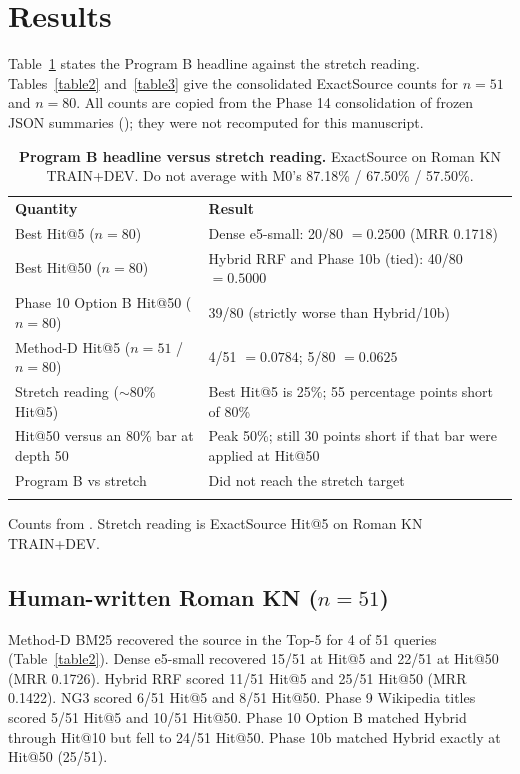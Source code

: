\documentclass[10pt,letterpaper]{article}
\newlength\savedwidth
\newcommand\thickhline{\noalign{\global\savedwidth\arrayrulewidth\global\arrayrulewidth 2pt}%
\hline
\noalign{\global\arrayrulewidth\savedwidth}}
\begin{document}
\section*{Results}
Table~\ref{table1} states the Program B headline against the stretch reading. Tables~\ref{table2} and~\ref{table3} give the consolidated ExactSource counts for $n = 51$ and $n = 80$. All counts are copied from the Phase 14 consolidation of frozen JSON summaries (); they were not recomputed for this manuscript.

\begin{table}[!ht]
\centering
\caption{\textbf{Program B headline versus stretch reading.} ExactSource on Roman KN TRAIN+DEV. Do not average with M0's 87.18\% / 67.50\% / 57.50\%.}
\label{table1}
\begin{tabular}{ll}
\thickhline
\textbf{Quantity} & \textbf{Result} \\
\thickhline
Best Hit@5 ($n = 80$) & Dense e5-small: 20/80 $= 0.2500$ (MRR 0.1718) \\
Best Hit@50 ($n = 80$) & Hybrid RRF and Phase 10b (tied): 40/80 $= 0.5000$ \\
Phase 10 Option B Hit@50 ($n = 80$) & 39/80 (strictly worse than Hybrid/10b) \\
Method-D Hit@5 ($n = 51$ / $n = 80$) & 4/51 $= 0.0784$; 5/80 $= 0.0625$ \\
Stretch reading ($\sim$80\% Hit@5) & Best Hit@5 is 25\%; 55 percentage points short of 80\% \\
Hit@50 versus an 80\% bar at depth 50 & Peak 50\%; still 30 points short if that bar were applied at Hit@50 \\
Program B vs stretch & Did not reach the stretch target \\
\thickhline
\end{tabular}
\begin{flushleft} Counts from . Stretch reading is ExactSource Hit@5 on Roman KN TRAIN+DEV.
\end{flushleft}
\end{table}

\subsection*{Human-written Roman KN ($n = 51$)}

Method-D BM25 recovered the source in the Top-5 for 4 of 51 queries (Table~\ref{table2}). Dense e5-small recovered 15/51 at Hit@5 and 22/51 at Hit@50 (MRR 0.1726). Hybrid RRF scored 11/51 Hit@5 and 25/51 Hit@50 (MRR 0.1422). NG3 scored 6/51 Hit@5 and 8/51 Hit@50. Phase 9 Wikipedia titles scored 5/51 Hit@5 and 10/51 Hit@50. Phase 10 Option B matched Hybrid through Hit@10 but fell to 24/51 Hit@50. Phase 10b matched Hybrid exactly at Hit@50 (25/51).
\end{document}
